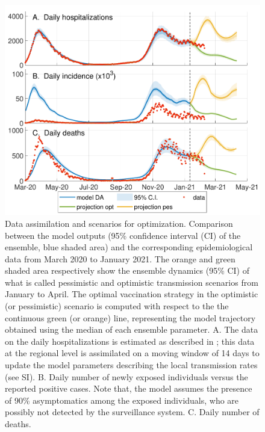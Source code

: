 \begin{figure}[!ht]%
    \centering
    \includegraphics{fig_italy-ocp/figures/DA_italy1.pdf}
    \caption[Data assimilation and scenarios for optimization]{Data assimilation and scenarios for optimization. Comparison between the model outputs (95\% confidence interval (CI) of the ensemble, blue shaded area) and the corresponding epidemiological data from March 2020 to January 2021. The orange and green shaded area respectively show the ensemble dynamics (95\% CI) of what is called pessimistic and optimistic transmission scenarios from January to April. The optimal vaccination strategy in the optimistic (or pessimistic) scenario is computed with respect to the the continuous green (or orange) line, representing the model trajectory obtained using the median of each ensemble parameter. A. The data on the daily hospitalizations is estimated as described in \parencite{Bertuzzo:GeographyCOVID19Spread:2020}; this data at the regional level is assimilated on a moving window of 14 days to update the model parameters describing the local transmission rates (see SI). B. Daily number of newly exposed individuals versus the reported positive cases. Note that, the model assumes the presence of 90\% asymptomatics among the exposed individuals, who are possibly not detected by the surveillance system. C. Daily number of deaths. %
    }\label{fig:model_DA}
\end{figure}


